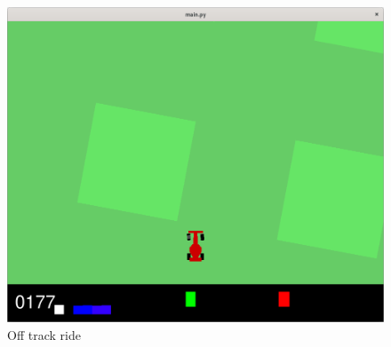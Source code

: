 \documentclass[runningheads]{llncs}
\begin{document}
\begin{figure}
  \includegraphics[width=\textwidth]{Screenshots/off_track.png}
  \caption{Off track ride}
  \label{fig:off_track}
\end{figure}
\end{document}
